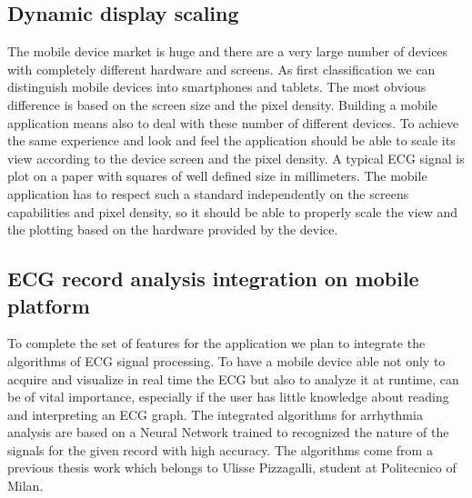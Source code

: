 \subsection{Dynamic display scaling}
The mobile device market is huge and there are a very large number of devices with completely different hardware and screens. As first classification we can distinguish mobile devices into smartphones and tablets. The most obvious difference is based on the screen size and the pixel density. Building a mobile application means also to deal with these number of different devices. To achieve the same experience and look and feel the application should be able to scale its view according to the device screen and the pixel density. A typical ECG signal is plot on a paper with squares of well defined size in millimeters. The mobile application has to respect such a standard independently on the screens capabilities and pixel density, so it should be able to properly scale the view and the plotting based on the hardware provided by the device.
\subsection{ECG record analysis integration on mobile platform}
To complete the set of features for the application we plan to integrate the algorithms of ECG signal processing. To have a mobile device able not only to acquire and visualize in real time the ECG but also to analyze it at runtime, can be of vital importance, especially if the user has little knowledge about reading and interpreting an ECG graph. The integrated algorithms for arrhythmia analysis are based on a Neural Network trained to recognized the nature of the signals for the given record with high accuracy. The algorithms come from a previous thesis work\cite{ref3} which belongs to Ulisse Pizzagalli, student at Politecnico of Milan.
